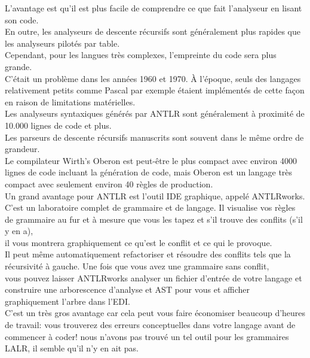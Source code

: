 \documentclass[12pt]{article}
\begin{document}
 L'avantage est qu'il est plus facile de comprendre ce que fait l'analyseur en lisant son code.\\
 En outre, les analyseurs de descente récursifs sont généralement plus rapides que les analyseurs pilotés par table.\\ 
 
 Cependant, pour les langues très complexes, l'empreinte du code sera plus grande. \\
 C'était un problème dans les années 1960 et 1970. 
 À l'époque, seuls des langages relativement petits comme Pascal par exemple étaient implémentés de cette façon en raison de limitations matérielles.\\

Les analyseurs syntaxiques générés par ANTLR sont généralement à proximité de 10.000 lignes de code et plus. \\
Les parseurs de descente récursifs manuscrits sont souvent dans le même ordre de grandeur. \\
Le compilateur Wirth's Oberon est peut-être le plus compact avec environ 4000 lignes de code incluant la génération de code, 
mais Oberon est un langage très compact avec seulement environ 40 règles de production.\\

Un grand avantage pour ANTLR est l'outil IDE graphique, appelé ANTLRworks. \\
C'est un laboratoire complet de grammaire et de langage. Il visualise vos règles de grammaire au fur et à mesure que vous les tapez et s'il trouve des conflits (s'il y en a), \\
il vous montrera graphiquement ce qu'est le conflit et ce qui le provoque. \\

Il peut même automatiquement refactoriser et résoudre des conflits tels que la récursivité à gauche. Une fois que vous avez une grammaire sans conflit, \\
vous pouvez laisser ANTLRworks analyser un fichier d'entrée de votre langage et construire une arborescence d'analyse 
et AST pour vous et afficher graphiquement l'arbre dans l'EDI. \\

C'est un très gros avantage car cela peut vous faire économiser beaucoup d'heures de travail: vous trouverez des erreurs conceptuelles dans votre langage avant de commencer à coder! nous n'avons pas trouvé un tel outil pour les grammaires LALR, il semble qu'il n'y en ait pas.\\
\end{document}
